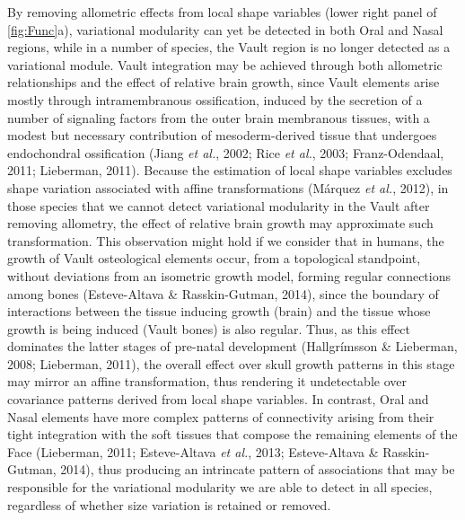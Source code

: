 \documentclass[12pt,twoside]{report}
\begin{document}
By removing allometric effects from local shape variables (lower right
panel of \autoref{fig:Func}a), variational modularity can yet be
detected in both Oral and Nasal regions, while in a number of species,
the Vault region is no longer detected as a variational module. Vault
integration may be achieved through both allometric relationships and
the effect of relative brain growth, since Vault elements arise mostly
through intramembranous ossification, induced by the secretion of a
number of signaling factors from the outer brain membranous tissues,
with a modest but necessary contribution of mesoderm-derived tissue that
undergoes endochondral ossification (Jiang \emph{et al.}, 2002; Rice
\emph{et al.}, 2003; Franz-Odendaal, 2011; Lieberman, 2011). Because the
estimation of local shape variables excludes shape variation associated
with affine transformations (Márquez \emph{et al.}, 2012), in those
species that we cannot detect variational modularity in the Vault after
removing allometry, the effect of relative brain growth may approximate
such transformation. This observation might hold if we consider that in
humans, the growth of Vault osteological elements occur, from a
topological standpoint, without deviations from an isometric growth
model, forming regular connections among bones (Esteve-Altava \&
Rasskin-Gutman, 2014), since the boundary of interactions between the
tissue inducing growth (brain) and the tissue whose growth is being
induced (Vault bones) is also regular. Thus, as this effect dominates
the latter stages of pre-natal development (Hallgrímsson \& Lieberman,
2008; Lieberman, 2011), the overall effect over skull growth patterns in
this stage may mirror an affine transformation, thus rendering it
undetectable over covariance patterns derived from local shape
variables. In contrast, Oral and Nasal elements have more complex
patterns of connectivity arising from their tight integration with the
soft tissues that compose the remaining elements of the Face (Lieberman,
2011; Esteve-Altava \emph{et al.}, 2013; Esteve-Altava \&
Rasskin-Gutman, 2014), thus producing an intrincate pattern of
associations that may be responsible for the variational modularity we
are able to detect in all species, regardless of whether size variation
is retained or removed.
\end{document}
